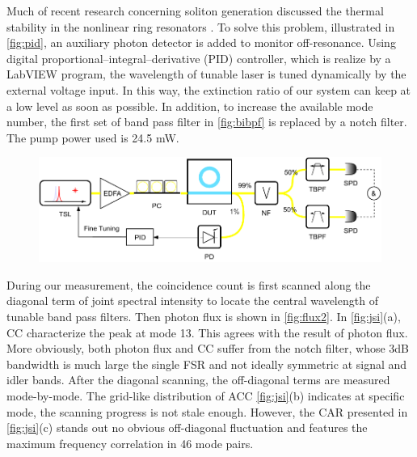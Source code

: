 Much of recent research concerning soliton generation discussed the thermal stability in the nonlinear ring resonators \cites{Guo2017a,Herr2012}. 
To solve this problem, illustrated in \autoref{fig:pid}, an auxiliary photon detector is added to monitor off-resonance. Using digital proportional–integral–derivative (PID) controller, which is realize by a LabVIEW program, the wavelength of tunable laser is tuned dynamically by the external voltage input. In this way, the extinction ratio of our system can keep at a low level as soon as possible. In addition, to increase the available mode number, the first set of band pass filter in \autoref{fig:bibpf} is replaced by a notch filter. The pump power used is 24.5 mW.

\begin{figure}
	\centering
	\includegraphics[width=1\linewidth]{imgs/pid.pdf}
	\caption{}
	\label{fig:pid}
\end{figure}

During our measurement, the coincidence count is first scanned along the diagonal term of joint spectral intensity to locate the central wavelength of tunable band pass filters. Then photon flux is shown in \autoref{fig:flux2}. In \autoref{fig:jsi}(a), CC characterize the peak at mode 13. This agrees with the result of photon flux. More obviously, both photon flux and CC suffer from the notch filter, whose 3dB bandwidth is much large the single FSR and not ideally symmetric at signal and idler bands. After the diagonal scanning, the off-diagonal terms are measured mode-by-mode. The grid-like distribution of ACC \autoref{fig:jsi}(b) indicates at specific mode, the scanning progress is not stale enough.
However, the CAR presented in \autoref{fig:jsi}(c) stands out no obvious off-diagonal fluctuation and features the maximum frequency correlation in 46 mode pairs.

